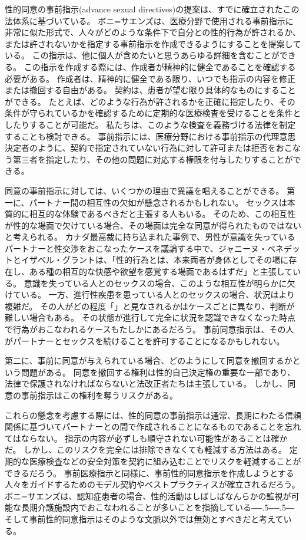 \documentclass[paper=a4,book,openany]{jlreq}
\def\DDASH{―\kern-.5\zw―\kern-.5\zw―} %
\begin{document}
性的同意の事前指示(advance sexual directives)の提案は、すでに確立されたこの法体系に基づいている。
ボニ=サエンズは、医療分野で使用される事前指示に非常に似た形式で、人々がどのような条件下で自分との性的行為が許されるか、または許されないかを指定する事前指示を作成できるようにすることを提案している\citep{boni-saenz15:_sexual_incap}。
この指示は、他に個人が含めたいと思うあらゆる詳細を含むことができる。
この指示を作成する際には、作成者が精神的に健全であることを確認する必要がある。
作成者は、精神的に健全である限り、いつでも指示の内容を修正または撤回する自由がある。
契約は、患者が望む限り具体的なものにすることができる。
たとえば、どのような行為が許されるかを正確に指定したり、その条件が守られているかを確認するために定期的な医療検査を受けることを条件としたりすることが可能だ。
私たちは、このような検査を義務づける法律を制定することも検討できる。
事前指示には、医療分野における事前指示の代理意思決定者のように、契約で指定されていない行為に対して許可または拒否をおこなう第三者を指定したり、その他の問題に対応する権限を付与したりすることができる。

同意の事前指示に対しては、いくつかの理由で異議を唱えることができる。
第一に、パートナー間の相互性の欠如が懸念されるかもしれない。
セックスは本質的に相互的な体験であるべきだと主張する人もいる。
そのため、この相互性が性的な場面で欠けている場合、その場面は完全な同意が得られたものではないと考えられる。
カナダ最高裁に持ち込まれた事例で、男性が意識を失っているパートナーと性交渉をおこなったケースを議論する中で、ジャニーヌ・ベネデットとイザベル・グラントは、「性的行為とは、本来両者が身体としてその場に存在し、ある種の相互的な快感や欲望を感覚する場面であるはずだ」と主張している\citep[p.80]{benedet10:confusing}。
意識を失っている人とのセックスの場合、このような相互性が明らかに欠けている。
一方、進行性疾患を患っている人とのセックスの場合、状況はより複雑だ。
その人がどの程度「」と見なされるかはケースごとに異なり、判断が難しい場合もある。
その状態が進行して完全に状況を認識できなくなった時点で行為がおこなわれるケースもたしかにあるだろう。
事前同意指示は、その人がパートナーとセックスを続けることを許可することになるかもしれない。

第二に、事前に同意が与えられている場合、どのようにして同意を撤回するかという問題がある。
同意を撤回する権利は性的自己決定権の重要な一部であり、法律で保護されなければならないと法改正者たちは主張している。
しかし、同意の事前指示はこの権利を奪うリスクがある。

これらの懸念を考慮する際には、性的同意の事前指示は通常、長期にわたる信頼関係に基づいてパートナーとの間で作成されることになるものであることを忘れてはならない。
指示の内容が必ずしも順守されない可能性があることは確かだ。
しかし、このリスクを完全には排除できなくても軽減する方法はある。
定期的な医療検査などの安全対策を契約に組み込むことでリスクを軽減することができるだろう。
事前医療指示と同様に、事前性的同意指示を作成しようとする人々をガイドするためのモデル契約やベストプラクティスが確立されるだろう。
ボニ=サエンズは、認知症患者の場合、性的活動はしばしばなんらかの監視が可能な長期介護施設内でおこなわれることが多いことを指摘している{\DDASH}そして事前性的同意指示はそのような文脈以外では無効とすべきだと考えている\citep[p.43]{boni-saenz15:_sexual_incap}。
\end{document}
